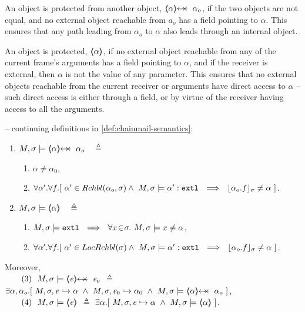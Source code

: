  An object is protected from another object, $\protectedFrom{{\alpha}} {{\alpha_{o}}}$, if 
the two objects are not equal, and no external object reachable from $a_o$ has a field pointing to  $\alpha$.
This ensures  that any path leading from $\alpha_o$ to $\alpha$ also leads through an internal object.
 

An object is protected,  $\langle\!\!\langle {\alpha} \rangle\!\!\rangle$,  if no external object reachable from any of the current frame's arguments has a field pointing to $\alpha$, and if the receiver is external, then   $\alpha$ is not the value of any parameter.  
This  ensures that no external objects reachable from the current receiver or arguments have direct access to $\alpha$ -- such direct access
 is either through a field, or by virtue of the receiver having access to all the arguments.
 


 
\begin{definition} 
\label{def:chainmail-protection-from}
\label{sect:semantics:assert:prtFrom}
 \label{def:chainmail-protection}
-- continuing definitions in \ref{def:chainmail-semantics}:
\begin{enumerate}
\item
\label{cProtected}
 $\satisfiesA{M}{\sigma}{\protectedFrom{{\alpha}} {{\alpha_{o}}}}   \ \ \ \triangleq $ 
  \begin{enumerate}
 \item
$\alpha\neq \alpha_0$,
 \item
$\forall \alpha'.\forall f.[\ \alpha' \in {\ensuremath{Rchbl(\alpha_o,\sigma)}} \wedge\   M , \sigma \models \alpha':\mbox{\normalfont{\texttt{extl}}} 
\ \ \Longrightarrow \ \  
  \lfloor \alpha_o.f \rfloor_{\sigma} \neq \alpha     \ ] $.
\end{enumerate}
\item
\label{sect:semantics:assert:prt}
$\satisfiesA{M}{\sigma} {\inside {\alpha}}  \ \ \ \triangleq \ \ \   $
 \begin{enumerate}
\item
 $\satisfiesA{M}{\sigma}{\extThis}\ \ \Longrightarrow\ \ \forall x\!\in\! \sigma.\ \satisfiesA{M}{\sigma}{x\neq \alpha}$,
 \item
$\forall \alpha'.\forall f.[\ \alpha' \in {\ensuremath{LocRchbl(\sigma)}} \wedge\   M , \sigma \models \alpha':\mbox{\normalfont{\texttt{extl}}} 
\ \ \Longrightarrow \ \  
  \lfloor \alpha_o.f \rfloor_{\sigma} \neq \alpha     \ ] $.
  \end{enumerate}
\end{enumerate}
Moreover,  \\
$\strut \ \ \ \ \ \  (3) \ \  \satisfiesA{M}{\sigma}{\protectedFrom{{\re}} {{\re_{o}}}}$ $ \triangleq$
$\exists \alpha, \alpha_{o}. [\  \eval{M}{\sigma}{{\re}}{\alpha}\ \wedge\ \eval{M}{\sigma}{{\re_0}}{\alpha_0} \  \wedge \ 
  \satisfiesA{M}{\sigma}{\protectedFrom{{\alpha}} {{\alpha_{o}}}}\   ]$, \\
  $\strut \ \ \ \ \ \ (4) \ \ \satisfiesA{M}{\sigma}{\inside{\re}}$  $\triangleq$
 $\exists \alpha. [\   M, \sigma, {\mathit{e}} \hookrightarrow \alpha\ \wedge \   M , \sigma \models \langle\!\!\langle \alpha \rangle\!\!\rangle \  ]$. 

 \end{definition} 
 
